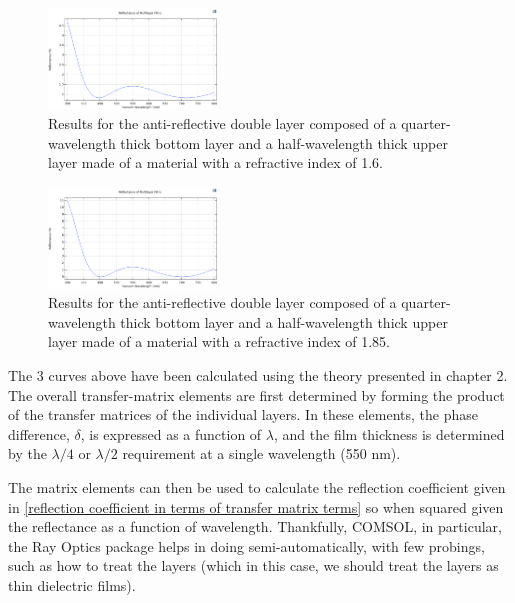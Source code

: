 \begin{figure}[ht!]
  \centering
  \includegraphics[width=0.4\textwidth]{Chapters/Figures/Chapter 4 Figures/Antireflective Figure b.png}
  \caption{Results for the anti-reflective double layer composed of a quarter-wavelength thick bottom layer and a half-wavelength thick upper layer made of a material with a refractive index of 1.6.}
  \label{fig:Antireflective Figure b}
\end{figure}

\begin{figure}[ht!]
  \centering
  \includegraphics[width=0.4\textwidth]{Chapters/Figures/Chapter 4 Figures/Antireflective Figure c.png}
  \caption{Results for the anti-reflective double layer composed of a quarter-wavelength thick bottom layer and a half-wavelength thick upper layer made of a material with a refractive index of 1.85.}
  \label{fig:Antireflective Figure c}
\end{figure}

The 3 curves above have been calculated using the theory presented in chapter 2. The overall transfer-matrix elements are first determined by forming the product of the transfer matrices of the individual layers. In these elements, the phase difference, $\delta$, is expressed as a function of $\lambda$, and the film thickness is determined by the $\lambda/4$ or $\lambda/2$ requirement at a single wavelength (550 nm).

The matrix elements can then be used to calculate the reflection coefficient given in \ref{reflection coefficient in terms of transfer matrix terms} so when squared given the reflectance as a function of wavelength. Thankfully, COMSOL, in particular, the Ray Optics package helps in doing semi-automatically, with few probings, such as how to treat the layers (which in this case, we should treat the layers as thin dielectric films).